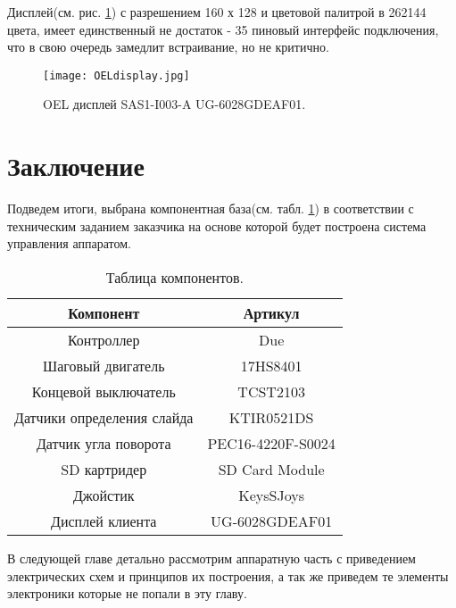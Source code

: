 Дисплей(см. рис. \ref{fig:OELdisplay}) с разрешением 160 х 128 и цветовой палитрой в 262144 цвета, имеет единственный не достаток - 35 пиновый интерфейс подключения, что в свою очередь замедлит встраивание, но не критично.
\begin{figure}[ht]
	\centering
     \texttt{[image: OELdisplay.jpg]}
	\caption
	{
	OEL дисплей SAS1-I003-A UG-6028GDEAF01.
	}
	\label{fig:OELdisplay}
\end{figure}

\section{Заключение}
Подведем итоги, выбрана компонентная база(см. табл. \ref{tab:components}) в соответствии с техническим заданием заказчика на основе которой будет построена система управления аппаратом.

\begin{table}[ht]
	\centering
\begin{tabular}{|c|c|}
\hline 
Компонент & Артикул \\ 
\hline 
Контроллер & Due \\ 
\hline 
Шаговый двигатель & 17HS8401 \\ 
\hline 
Концевой выключатель & TCST2103 \\ 
\hline 
Датчики определения слайда & KTIR0521DS \\ 
\hline 
Датчик угла поворота & PEC16-4220F-S0024 \\ 
\hline 
SD картридер & SD Card Module \\ 
\hline 
Джойстик &  KeysSJoys \\ 
\hline 
Дисплей клиента & UG-6028GDEAF01 \\ 
\hline 

\end{tabular} 
	\caption{Таблица компонентов.}
	\label{tab:components}
\end{table}

В следующей главе детально рассмотрим аппаратную часть с приведением электрических схем и принципов их построения, а так же приведем те элементы электроники которые не попали в эту главу.